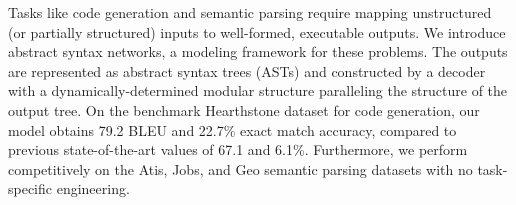 Tasks like code generation and semantic parsing require mapping unstructured (or partially structured) inputs to well-formed, executable outputs. We introduce abstract syntax networks, a modeling framework for these problems. The outputs are represented as abstract syntax trees (ASTs) and constructed by a decoder with a dynamically-determined modular structure paralleling the structure of the output tree. On the benchmark Hearthstone dataset for code generation, our model obtains 79.2 BLEU and 22.7\% exact match accuracy, compared to previous state-of-the-art values of 67.1 and 6.1\%. Furthermore, we perform competitively on the Atis, Jobs, and Geo semantic parsing datasets with no task-specific engineering.
